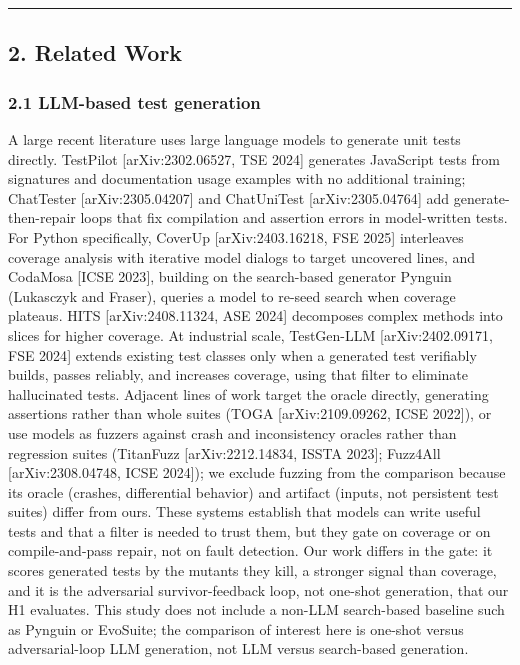 \documentclass[
  11pt,
]{article}
\begin{document}
\begin{center}\rule{0.5\linewidth}{0.5pt}\end{center}

\subsection{2. Related Work}\label{related-work}

\subsubsection{2.1 LLM-based test
generation}\label{llm-based-test-generation}

A large recent literature uses large language models to generate unit
tests directly. TestPilot {[}arXiv:2302.06527, TSE 2024{]} generates
JavaScript tests from signatures and documentation usage examples with
no additional training; ChatTester {[}arXiv:2305.04207{]} and
ChatUniTest {[}arXiv:2305.04764{]} add generate-then-repair loops that
fix compilation and assertion errors in model-written tests. For Python
specifically, CoverUp {[}arXiv:2403.16218, FSE 2025{]} interleaves
coverage analysis with iterative model dialogs to target uncovered
lines, and CodaMosa {[}ICSE 2023{]}, building on the search-based
generator Pynguin (Lukasczyk and Fraser), queries a model to re-seed
search when coverage plateaus. HITS {[}arXiv:2408.11324, ASE 2024{]}
decomposes complex methods into slices for higher coverage. At
industrial scale, TestGen-LLM {[}arXiv:2402.09171, FSE 2024{]} extends
existing test classes only when a generated test verifiably builds,
passes reliably, and increases coverage, using that filter to eliminate
hallucinated tests. Adjacent lines of work target the oracle directly,
generating assertions rather than whole suites (TOGA
{[}arXiv:2109.09262, ICSE 2022{]}), or use models as fuzzers against
crash and inconsistency oracles rather than regression suites (TitanFuzz
{[}arXiv:2212.14834, ISSTA 2023{]}; Fuzz4All {[}arXiv:2308.04748, ICSE
2024{]}); we exclude fuzzing from the comparison because its oracle
(crashes, differential behavior) and artifact (inputs, not persistent
test suites) differ from ours. These systems establish that models can
write useful tests and that a filter is needed to trust them, but they
gate on coverage or on compile-and-pass repair, not on fault detection.
Our work differs in the gate: it scores generated tests by the mutants
they kill, a stronger signal than coverage, and it is the adversarial
survivor-feedback loop, not one-shot generation, that our H1 evaluates.
This study does not include a non-LLM search-based baseline such as
Pynguin or EvoSuite; the comparison of interest here is one-shot versus
adversarial-loop LLM generation, not LLM versus search-based generation.
\end{document}
